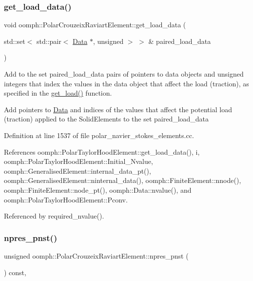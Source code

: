 \subsubsection{\texorpdfstring{get\+\_\+load\+\_\+data()}{get\_load\_data()}}
{\footnotesize\ttfamily void oomph\+::\+Polar\+Crouzeix\+Raviart\+Element\+::get\+\_\+load\+\_\+data (\begin{DoxyParamCaption}\item[{std\+::set$<$ std\+::pair$<$ \hyperlink{classoomph_1_1Data}{Data} $\ast$, unsigned $>$ $>$ \&}]{paired\+\_\+load\+\_\+data }\end{DoxyParamCaption})}



Add to the set paired\+\_\+load\+\_\+data pairs of pointers to data objects and unsigned integers that index the values in the data object that affect the load (traction), as specified in the \hyperlink{classoomph_1_1PolarNavierStokesEquations_a47ae24dc603a7d46bd4a85ccfb2b8e23}{get\+\_\+load()} function. 

Add pointers to \hyperlink{classoomph_1_1Data}{Data} and indices of the values that affect the potential load (traction) applied to the Solid\+Elements to the set paired\+\_\+load\+\_\+data 

Definition at line 1537 of file polar\+\_\+navier\+\_\+stokes\+\_\+elements.\+cc.



References oomph\+::\+Polar\+Taylor\+Hood\+Element\+::get\+\_\+load\+\_\+data(), i, oomph\+::\+Polar\+Taylor\+Hood\+Element\+::\+Initial\+\_\+\+Nvalue, oomph\+::\+Generalised\+Element\+::internal\+\_\+data\+\_\+pt(), oomph\+::\+Generalised\+Element\+::ninternal\+\_\+data(), oomph\+::\+Finite\+Element\+::nnode(), oomph\+::\+Finite\+Element\+::node\+\_\+pt(), oomph\+::\+Data\+::nvalue(), and oomph\+::\+Polar\+Taylor\+Hood\+Element\+::\+Pconv.



Referenced by required\+\_\+nvalue().

\mbox{\label{classoomph_1_1PolarCrouzeixRaviartElement_a22bc07f82b9e2c5b373db917ca071085}} 
\subsubsection{\texorpdfstring{npres\+\_\+pnst()}{npres\_pnst()}}
{\footnotesize\ttfamily unsigned oomph\+::\+Polar\+Crouzeix\+Raviart\+Element\+::npres\+\_\+pnst (\begin{DoxyParamCaption}{ }\end{DoxyParamCaption}) const\hspace{0.3cm}{\ttfamily [inline]}, {\ttfamily [virtual]}}



